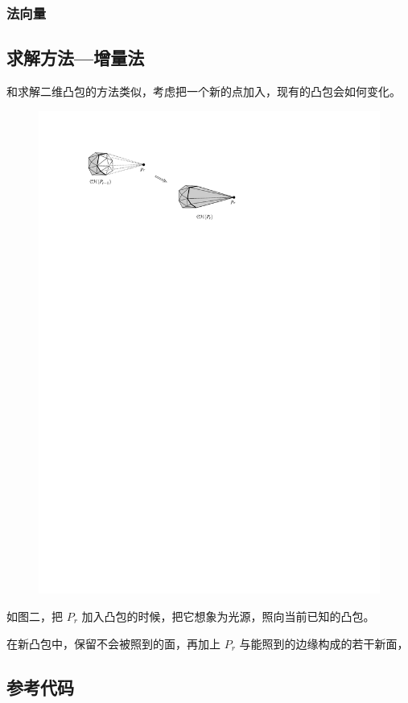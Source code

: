 \documentclass[a4paper, UTF8]{ctexart}
\begin{document}
\subsubsection{法向量}


\subsection{求解方法---增量法}

和求解二维凸包的方法类似，考虑把一个新的点加入，现有的凸包会如何变化。

\begin{figure}[H]
\centering
\includegraphics{fig/fig2.pdf}
\caption{}
\label{fig:2}
\end{figure}

如图二，把 $P_r$ 加入凸包的时候，把它想象为光源，照向当前已知的凸包。

在新凸包中，保留不会被照到的面，再加上 $P_r$ 与能照到的边缘构成的若干新面，


\subsection{参考代码}


\inputminted[numbers=left, tabsize=4, frame=lines]{c++}{cpp/convex-hull-3d.cpp}
\end{document}
